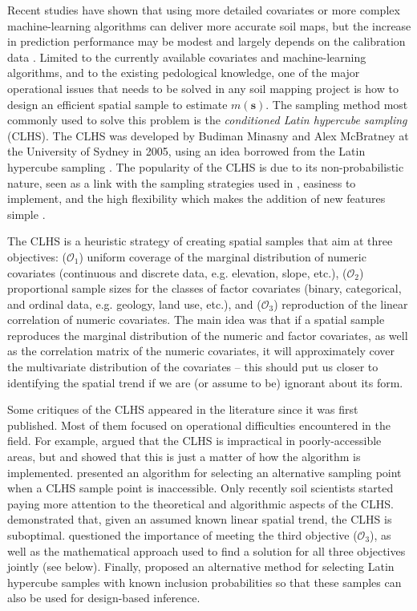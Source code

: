 Recent studies have shown that using more detailed covariates or more complex machine-learning algorithms can 
deliver more accurate soil maps, but the increase in prediction performance may be modest 
\cite{Samuel-RosaEtAl2015} and largely depends on the calibration data \cite{HeungEtAl2016}. Limited to the 
currently available covariates and machine-learning algorithms, and to the existing pedological knowledge, one 
of the major operational issues that needs to be solved in any soil mapping project is how to design an 
efficient spatial sample to estimate $m(\boldsymbol{s})$. The sampling method most commonly used to solve this 
problem is the \emph{conditioned Latin hypercube sampling} (CLHS). The CLHS was developed by Budiman Minasny 
and Alex McBratney at the University of Sydney in 2005, using an idea borrowed from the Latin hypercube 
sampling \cite{McKayEtAl1979, MinasnyEtAl2006b}. The popularity of the CLHS is due to its non-probabilistic 
nature, seen as a link with the sampling strategies used in , easiness to 
implement, and the high flexibility which makes the addition of new features simple \cite{MinasnyEtAl2010a, 
RoudierEtAl2012, MulderEtAl2013, CarvalhoJuniorEtAl2014, CliffordEtAl2014}.

The CLHS is a heuristic strategy of creating spatial samples that aim at three objectives: ($\mathcal{O}_1$) 
uniform coverage of the marginal distribution of numeric covariates (continuous and discrete data, e.g. 
elevation, slope, etc.), ($\mathcal{O}_2$) proportional sample sizes for the classes of factor covariates 
(binary, categorical, and ordinal data, e.g. geology, land use, etc.), and ($\mathcal{O}_3$) reproduction of 
the linear correlation of numeric covariates. The main idea was that if a spatial sample reproduces the 
marginal distribution of the numeric and factor covariates, as well as the correlation matrix of the numeric 
covariates, it will approximately cover the multivariate distribution of the covariates -- this should put us 
closer to identifying the  spatial trend if we are (or assume to be) ignorant about its form.

Some critiques of the CLHS appeared in the literature since it was first published. Most of them focused on 
operational difficulties encountered in the field. For example, \citet{CambuleEtAl2013} argued that the 
CLHS is impractical in poorly-accessible areas, but \citet{RoudierEtAl2012} and \citet{MulderEtAl2013} showed 
that this is just a matter of how the algorithm is implemented. \citet{CliffordEtAl2014} presented an 
algorithm for selecting an alternative sampling point when a CLHS sample point is inaccessible. Only recently 
soil scientists started paying more attention to the theoretical and algorithmic aspects of the CLHS. 
\citet{MinasnyEtAl2010a} demonstrated that, given an assumed known linear spatial trend, the CLHS is 
suboptimal. \citet{CliffordEtAl2014} questioned the importance of meeting the third objective 
($\mathcal{O}_3$), as well as the mathematical approach used to find a solution for all three objectives 
jointly (see below). Finally, \citet{Brus2015} proposed an alternative method for selecting Latin hypercube 
samples with known inclusion probabilities so that these samples can also be used for design-based inference.

